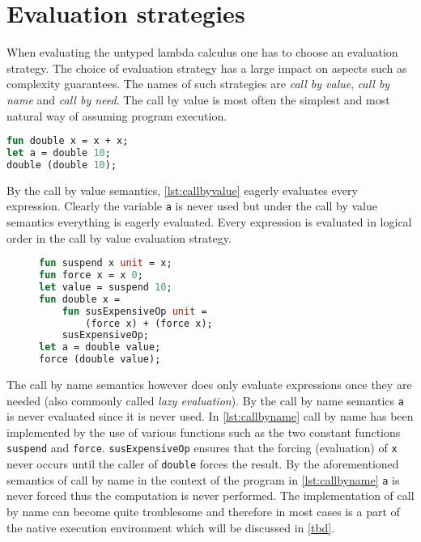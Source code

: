 \documentclass[11pt,oneside,a4paper]{report}
\begin{document}
\section{Evaluation strategies}
When evaluating the untyped lambda calculus one has to choose an evaluation strategy.
The choice of evaluation strategy has a large impact on aspects such as complexity guarantees.
The names of such strategies are \textit{call by value}, \textit{call by name} and \textit{call by need}.
The call by value is most often the simplest and most natural way of assuming program execution.
\begin{lstlisting}[language=ML,caption={Program that doubles values},label={lst:callbyvalue},mathescape=true]
fun double x = x + x;
let a = double 10;
double (double 10);
\end{lstlisting}
By the call by value semantics, \autoref{lst:callbyvalue} eagerly evaluates every expression.
Clearly the variable \texttt{a} is never used but under the call by value semantics everything is eagerly evaluated.
Every expression is evaluated in logical order in the call by value evaluation strategy.
\begin{figure}[ht]
\begin{lstlisting}[language=ML,caption={Implementation of call by name},label={lst:callbyname},mathescape=true]
fun suspend x unit = x;
fun force x = x 0;
let value = suspend 10;
fun double x = 
    fun susExpensiveOp unit = 
        (force x) + (force x);
    susExpensiveOp;
let a = double value;
force (double value);
\end{lstlisting}
\end{figure}
The call by name semantics however does only evaluate expressions once they are needed (also commonly called \textit{lazy evaluation}).
By the call by name semantics \texttt{a} is never evaluated since it is never used.
In \autoref{lst:callbyname} call by name has been implemented by the use of various functions such as the two constant functions \texttt{suspend} and \texttt{force}.
\texttt{susExpensiveOp} ensures that the forcing (evaluation) of \texttt{x} never occurs until the caller of \texttt{double} forces the result.
By the aforementioned semantics of call by name in the context of the program in \autoref{lst:callbyname} \texttt{a} is never forced thus the computation is never performed.
The implementation of call by name can become quite troublesome and therefore in most cases is a part of the native execution environment which will be discussed in \autoref{tbd}.
\end{document}
